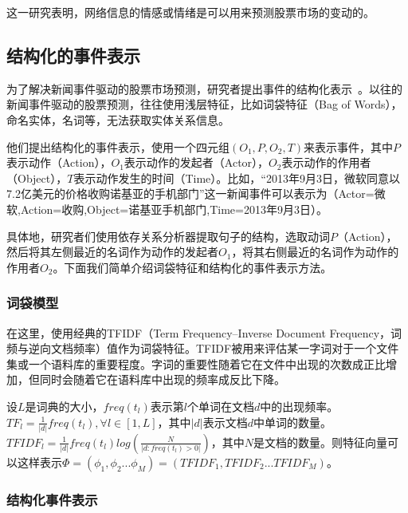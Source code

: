 这一研究表明，网络信息的情感或情绪是可以用来预测股票市场的变动的。

\subsection{结构化的事件表示}

为了解决新闻事件驱动的股票市场预测，研究者提出事件的结构化表示~\cite{ding2014using}。以往的新闻事件驱动的股票预测，往往使用浅层特征，比如词袋特征（Bag of Words），命名实体，名词等，无法获取实体关系信息。

他们提出结构化的事件表示，使用一个四元组$(O_1,P,O_2,T)$来表示事件，其中$P$表示动作（Action），$O_1$表示动作的发起者（Actor），$O_2$表示动作的作用者（Object），$T$表示动作发生的时间（Time）。比如，“2013年9月3日，微软同意以7.2亿美元的价格收购诺基亚的手机部门”这一新闻事件可以表示为（Actor=微软,Action=收购,Object=诺基亚手机部门,Time=2013年9月3日）。

具体地，研究者们使用依存关系分析器提取句子的结构，选取动词$P$（Action），然后将其左侧最近的名词作为动作的发起者$O_1$，将其右侧最近的名词作为动作的作用者$O_2$。下面我们简单介绍词袋特征和结构化的事件表示方法。

\subsubsection{词袋模型}

在这里，使用经典的TFIDF（Term Frequency–Inverse Document Frequency，词频与逆向文档频率）值作为词袋特征。TFIDF被用来评估某一字词对于一个文件集或一个语料库的重要程度。字词的重要性随着它在文件中出现的次数成正比增加，但同时会随着它在语料库中出现的频率成反比下降。

设$L$是词典的大小，$freq(t_l)$表示第$l$个单词在文档$d$中的出现频率。$TF_l=\frac{1}{|d|}freq(t_l),\forall l\in [1, L]$，其中$|d|$表示文档$d$中单词的数量。$TFIDF_l=\frac{1}{|d|}freq(t_l)log(\frac{N}{|d:freq(t_l)>0|})$，其中$N$是文档的数量。则特征向量可以这样表示$\Phi=(\phi_1,\phi_2...\phi_M)=(TFIDF_1,TFIDF_2...TFIDF_M)$。

\subsubsection{结构化事件表示}

